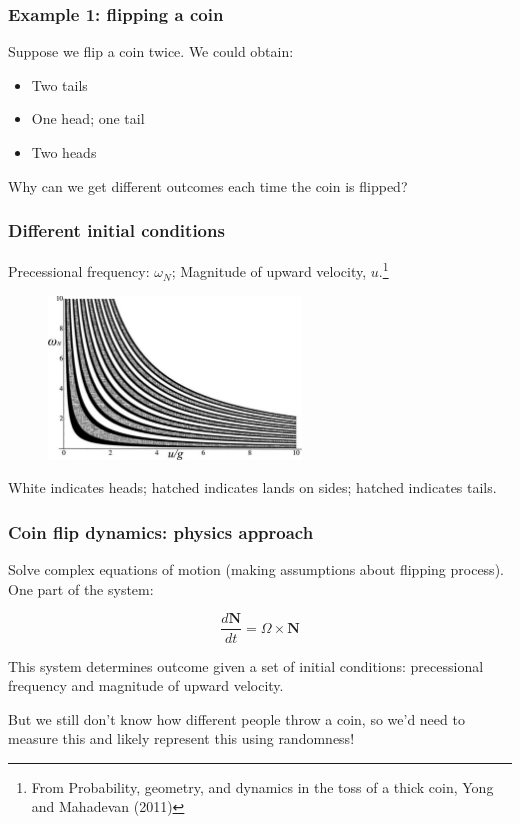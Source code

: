 \documentclass[handout]{beamer}
\begin{document}
\begin{frame}
	\frametitle{Example 1: flipping a coin}
	
	Suppose we flip a coin twice. We could obtain:
	
	\begin{itemize}
		\item Two tails
		\item One head; one tail
		\item Two heads
	\end{itemize}
	
	Why can we get different outcomes each time the coin is flipped?
	
\end{frame}

\begin{frame}
	\frametitle{Different initial conditions}
	
	Precessional frequency: $\omega_N$; Magnitude of upward velocity, $u$.\footnote{\tiny From Probability, geometry, and dynamics in the toss of a thick coin, Yong and Mahadevan (2011)}
	
	\begin{figure}[ht]
		\centerline{\includegraphics[width=0.6\textwidth]{../figures/coin_toss.pdf}}
	\end{figure}
	
	White indicates heads; hatched indicates lands on sides; hatched indicates tails.
	
\end{frame}

\begin{frame}
	\frametitle{Coin flip dynamics: physics approach}
	
	Solve complex equations of motion (making assumptions about flipping process). One part of the system:
	
	\begin{equation}
	\frac{d\boldsymbol{N}}{dt} = \Omega \times \boldsymbol{N}
	\end{equation}
	
	This system determines outcome given a set of initial conditions: precessional frequency and magnitude of upward velocity.
	
	\vspace{0.5cm}
	But we still don't know how different people throw a coin, so we'd need to measure this and likely represent this using randomness!
	
\end{frame}
\end{document}

